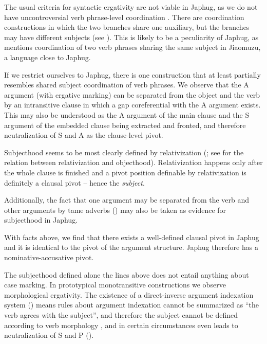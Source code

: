 \documentclass[a4paper, oneside, 12pt]{report}
\newcommand*{\citepage}[1]{p.~{#1}}
\newcommand*{\term}[1]{\emph{#1}}
\begin{document}
The usual criteria for syntactic ergativity are not viable in Japhug,
as we do not have uncontroversial verb phrase-level coordination \citep{jacques2014clause}.
There are coordination constructions in which the two branches share one auxiliary,
but the branches may have different subjects
(see ).
This is likely to be a peculiarity of Japhug,
as \citet[\citepage{549}]{prins2011web} mentions 
coordination of two verb phrases sharing the same subject
in Jiaomuzu, a language close to Japhug.

If we restrict ourselves to Japhug,
there is one construction that at least partially resembles
shared subject coordination of verb phrases.
We observe that the A argument (with ergative marking) 
can be separated from the object and the verb 
by an intransitive clause \citep[\citepage{306}]{jacques2021grammar}
in which a gap coreferential with the A argument exists.
This may also be understood 
as the A argument of the main clause and the S argument of the embedded clause
being extracted and fronted,
and therefore neutralization of S and A as the clause-level pivot.

Subjecthood seems to be most clearly defined by relativization
(\citealt{jacques2016subjects};
see  for the relation 
between relativization and objecthood).
Relativization happens only after the whole clause is finished
and a pivot position definable by relativization is definitely a clausal pivot
-- hence the \term{subject}.

Additionally, the fact that one argument may be separated from
the verb and other arguments by \ac{tame} adverbs
()
may also be taken as evidence for subjecthood in Japhug.

With facts above, we find that there exists a well-defined clausal pivot in Japhug
and it is identical to the pivot of the argument structure.
Japhug therefore has a nominative-accusative pivot.

The subjecthood defined alone the lines above does not entail
anything about case marking.
In prototypical monotransitive constructions
we observe morphological ergativity.
The existence of a direct-inverse argument indexation system ()
means rules about argument indexation cannot be summarized as 
``the verb agrees with the subject'',
and therefore the subject cannot be defined according to verb morphology \citep{jacques2016subjects},
and in certain circumstances even leads to neutralization of S and P
().
\end{document}
